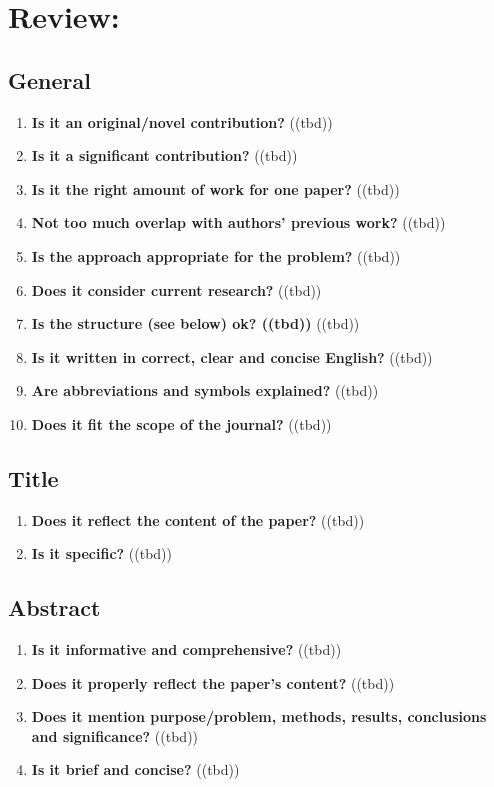 
\chapter*{Review: \metaTitle}\minitoc\label{sec:review}\vspace{.5cm}
\setcounter{chapter}{1}
\noindent\lipsum[7]

\section{General}\label{sec:general}
\begin{enumerate}[resume]
    \item \textbf{Is it an original/novel contribution?} ((tbd))
    \item \textbf{Is it a significant contribution?} ((tbd))
    \item \textbf{Is it the right amount of work for one paper?} ((tbd))
    \item \textbf{Not too much overlap with authors’ previous work?} ((tbd))
    \item \textbf{Is the approach appropriate for the problem?} ((tbd))
    \item \textbf{Does it consider current research?} ((tbd))
    \item \textbf{\textbf{Is the structure (see below) ok?} ((tbd))} ((tbd))
    \item \textbf{Is it written in correct, clear and concise English?} ((tbd))
    \item \textbf{Are abbreviations and symbols explained?} ((tbd))
    \item \textbf{Does it fit the scope of the journal?} ((tbd))
\end{enumerate}

\section{Title}\label{sec:title}
\begin{enumerate}[resume]
    \item \textbf{Does it reflect the content of the paper?} ((tbd))
    \item \textbf{Is it specific?} ((tbd))
\end{enumerate}

\section{Abstract}\label{sec:abstract}
\begin{enumerate}[resume]
    \item \textbf{Is it informative and comprehensive?} ((tbd))
    \item \textbf{Does it properly reflect the paper’s content?} ((tbd))
    \item \textbf{Does it mention purpose/problem, methods, results, conclusions and significance?} ((tbd))
    \item \textbf{Is it brief and concise?} ((tbd))
\end{enumerate}

